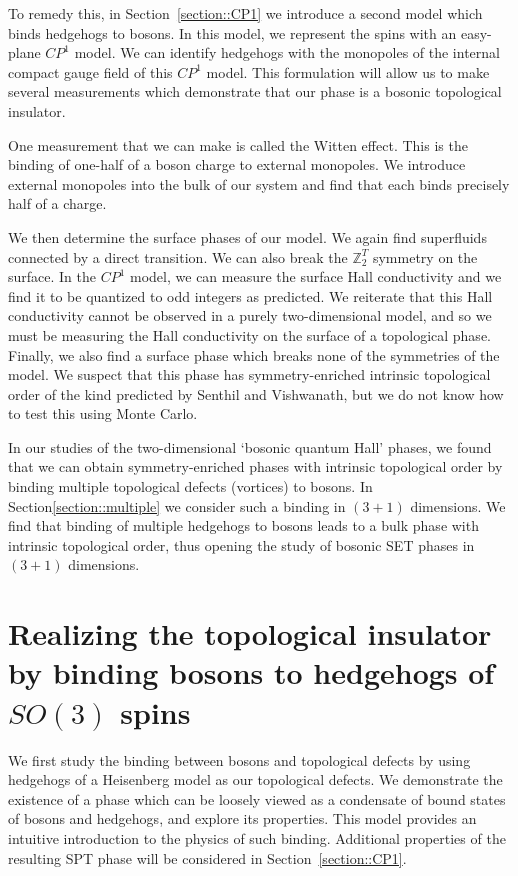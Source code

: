 \documentclass[prb,twocolumn]{revtex4-1}
\def\ztwot{\mathbb{Z}_2^T}
\newcommand{\cp}{$CP^1$ }
\begin{document}
To remedy this, in Section~\ref{section::CP1} we introduce a second model which binds hedgehogs to bosons. In this model, we represent the spins with an easy-plane \cp model. We can identify hedgehogs with the monopoles of the internal compact gauge field of this \cp model. This formulation will allow us to make several measurements which demonstrate that our phase is a bosonic topological insulator.

One measurement that we can make is called the Witten effect.\cite{MaxWitten,Max} This is the binding of one-half of a boson charge to external monopoles. We introduce external monopoles into the bulk of our system and find that each binds precisely half of a charge.

We then determine the surface phases of our model. We again find superfluids connected by a direct transition.  We can also break the $\ztwot$ symmetry on the surface. In the \cp model, we can measure the surface Hall conductivity and we find it to be quantized to odd integers as predicted. We reiterate that this Hall conductivity cannot be observed in a purely two-dimensional model, and so we must be measuring the Hall conductivity on the surface of a topological phase. Finally, we also find a surface phase which breaks none of the symmetries of the model. We suspect that this phase has symmetry-enriched intrinsic topological order of the kind predicted by Senthil and Vishwanath,\cite{SenthilVishwanath} but we do not know how to test this using Monte Carlo.

In our studies of the two-dimensional `bosonic quantum Hall' phases,\cite{FQHE} we found that we can obtain symmetry-enriched phases with intrinsic topological order by binding multiple topological defects (vortices) to bosons. In Section\ref{section::multiple} we consider such a binding in $(3+1)$ dimensions. We find that binding of multiple hedgehogs to bosons leads to a bulk phase with intrinsic topological order, thus opening the study of bosonic SET phases in $(3+1)$ dimensions.

\section{Realizing the topological insulator by binding bosons to hedgehogs of $SO(3)$ spins}
\label{section::Heisenberg}

We first study the binding between bosons and topological defects by using hedgehogs of a Heisenberg model as our topological defects. We demonstrate the existence of a phase which can be loosely viewed as a condensate of bound states of bosons and hedgehogs, and explore its properties. This model provides an intuitive introduction to the physics of such binding. Additional properties of the resulting SPT phase will be considered in Section~\ref{section::CP1}.
\end{document}
